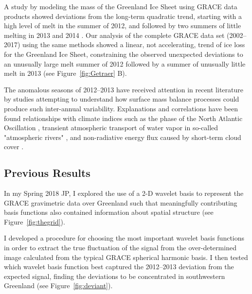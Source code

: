 \documentclass[12pt]{article}
\begin{document}
A study by \cite{Harig+2016} modeling the mass of the Greenland Ice Sheet
using GRACE data products showed deviations from the long-term quadratic
trend, starting with a high level of melt in the summer of 2012, and followed by two
summers of little melting in 2013 and 2014 \cite[see
Figure~\ref{fig:Getraer} A, comparable to][their
Figure~4]{Harig+2016}. Our analysis of the complete GRACE data set (2002--2017) using the same methods showed a linear,
 not accelerating, trend of ice loss for the Greenland Ice Sheet, constraining the observed unexpected deviations to an unusually large melt summer of 2012 followed by a summer of unusually little melt in 2013 (see
Figure~\ref{fig:Getraer} B). 



The anomalous seasons of 2012--2013 have received attention in recent literature by studies attempting to understand how surface mass balance processes could produce such inter-annual variability. Explanations and correlations have been found relationships with climate indices such as the phase of the North Atlantic Oscillation \cite[][as well as my Fall 2017 JP]{mcmillan2016,bevis2018}, transient atmospheric transport of water vapor in so-called "atmospheric rivers" \citep{mattingly2018}, and non-radiative energy flux caused by short-term cloud cover \citep{solomon2017}. 

\subsection{Previous Results \label{sec:prevresults}}
In my Spring 2018 JP, I explored the use of a 2-D wavelet basis to represent the GRACE gravimetric data over Greenland such that meaningfully contributing basis functions also contained information about spatial structure (see
Figure~\ref{fig:thegrid}). 

I developed a procedure for choosing the most important wavelet basis functions in order to extract the true fluctuation of the signal from the over-determined image calculated from the typical GRACE spherical harmonic basis. I then tested which wavelet basis function best captured the 2012--2013 deviation from the expected signal, finding the deviations to be concentrated in southwestern Greenland (see
Figure~\ref{fig:deviant}). 
\end{document}
